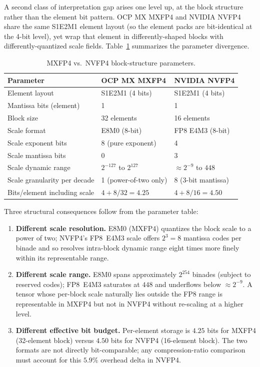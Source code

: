 \documentclass[11pt,letterpaper]{article}
\begin{document}
A second class of interpretation gap arises one level up, at the block
structure rather than the element bit pattern.  OCP MX MXFP4 and NVIDIA NVFP4
\cite{nvfp4} share the same S1E2M1 element layout (so the element packs are
bit-identical at the 4-bit level), yet wrap that element in differently-shaped
blocks with differently-quantized scale fields.  Table~\ref{tab:gap_4bit}
summarizes the parameter divergence.

\begin{table}[h]
\centering
\caption{MXFP4 vs.\ NVFP4 block-structure parameters.}
\label{tab:gap_4bit}
\small
\begin{tabular}{lll}
\toprule
\textbf{Parameter} & \textbf{OCP MX MXFP4} & \textbf{NVIDIA NVFP4} \\
\midrule
Element layout & S1E2M1 (4 bits) & S1E2M1 (4 bits) \\
Mantissa bits (element) & 1 & 1 \\
Block size & 32 elements & 16 elements \\
Scale format & E8M0 (8-bit) & FP8 E4M3 (8-bit) \\
Scale exponent bits & 8 (pure exponent) & 4 \\
Scale mantissa bits & 0 & 3 \\
Scale dynamic range & $2^{-127}$ to $2^{127}$ & $\approx 2^{-9}$ to $448$ \\
Scale granularity per decade & 1 (power-of-two only) & 8 (3-bit mantissa) \\
Bits/element including scale & $4 + 8/32 = 4.25$ & $4 + 8/16 = 4.50$ \\
\bottomrule
\end{tabular}
\end{table}

Three structural consequences follow from the parameter table:

\begin{enumerate}
  \item \textbf{Different scale resolution.}  E8M0 (MXFP4) quantizes the
    block scale to a power of two; NVFP4's FP8~E4M3 scale offers $2^3 = 8$
    mantissa codes per binade and so resolves intra-block dynamic range
    eight times more finely within its representable range.
  \item \textbf{Different scale range.}  E8M0 spans approximately $2^{254}$
    binades (subject to reserved codes); FP8~E4M3 saturates at $448$ and
    underflows below $\approx 2^{-9}$.  A tensor whose per-block scale
    naturally lies outside the FP8 range is representable in MXFP4 but not
    in NVFP4 without re-scaling at a higher level.
  \item \textbf{Different effective bit budget.}  Per-element storage is
    $4.25$ bits for MXFP4 (32-element block) versus $4.50$ bits for NVFP4
    (16-element block).  The two formats are not directly bit-comparable;
    any compression-ratio comparison must account for this $5.9\%$ overhead
    delta in NVFP4.
\end{enumerate}
\end{document}
